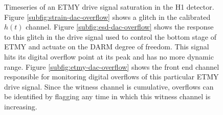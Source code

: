 \begin{figure}[ht!]%
\centering
{}

\caption[ETMY saturation]{Timeseries of an ETMY drive signal saturation in the 
         H1 detector. Figure \ref{subfig:strain-dac-overflow} shows a glitch in 
         the calibrated $h(t)$ channel. Figure \ref{subfig:esd-dac-overflow} shows 
         the response to this glitch in the drive signal used to control the bottom 
         stage of ETMY and actuate on the DARM degree of freedom. This signal hits 
         its digital overflow point at its peak and has no more dynamic range. 
         Figure \ref{subfig:etmy-dac-overflow} shows the front end channel responsible 
         for monitoring digital overflows of this particular ETMY drive signal. 
         Since the witness channel is cumulative, overflows can be identified by 
         flagging any time in which this witness channel is increasing. }
\label{fig:dac-overflow}
\end{figure}

